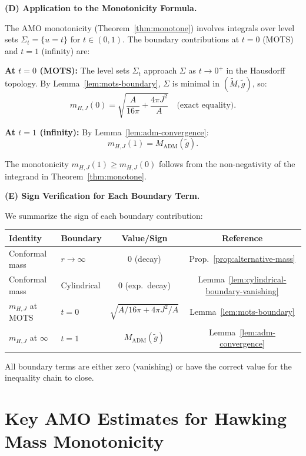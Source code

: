 \documentclass[12pt]{article}
\theoremstyle{plain}
\theoremstyle{definition}
\theoremstyle{remark}
\newcommand{\ADM}{\mathrm{ADM}}
\newcommand{\tM}{\tilde{M}}
\newcommand{\tg}{\tilde{g}}
\begin{document}
\textbf{(D) Application to the Monotonicity Formula.}

The AMO monotonicity (Theorem~\ref{thm:monotone}) involves integrals over level sets $\Sigma_t = \{u = t\}$ for $t \in (0,1)$. The boundary contributions at $t = 0$ (MOTS) and $t = 1$ (infinity) are:

\textbf{At $t = 0$ (MOTS):} The level sets $\Sigma_t$ approach $\Sigma$ as $t \to 0^+$ in the Hausdorff topology. By Lemma~\ref{lem:mots-boundary}, $\Sigma$ is minimal in $(\tM, \tg)$, so:
\[
m_{H,J}(0) = \sqrt{\frac{A}{16\pi} + \frac{4\pi J^2}{A}} \quad \text{(exact equality)}.
\]

\textbf{At $t = 1$ (infinity):} By Lemma~\ref{lem:adm-convergence}:
\[
m_{H,J}(1) = M_{\ADM}(\tg).
\]

The monotonicity $m_{H,J}(1) \geq m_{H,J}(0)$ follows from the non-negativity of the integrand in Theorem~\ref{thm:monotone}.

\textbf{(E) Sign Verification for Each Boundary Term.}

We summarize the sign of each boundary contribution:

\begin{center}
\begin{tabular}{@{}llcc@{}}
\toprule
\textbf{Identity} & \textbf{Boundary} & \textbf{Value/Sign} & \textbf{Reference} \\
\midrule
Conformal mass & $r \to \infty$ & $0$ (decay) & Prop.~\ref{prop:alternative-mass} \\
Conformal mass & Cylindrical & $0$ (exp.\ decay) & Lemma~\ref{lem:cylindrical-boundary-vanishing} \\
$m_{H,J}$ at MOTS & $t = 0$ & $\sqrt{A/16\pi + 4\pi J^2/A}$ & Lemma~\ref{lem:mots-boundary} \\
$m_{H,J}$ at $\infty$ & $t = 1$ & $M_{\ADM}(\tg)$ & Lemma~\ref{lem:adm-convergence} \\
\bottomrule
\end{tabular}
\end{center}

All boundary terms are either zero (vanishing) or have the correct value for the inequality chain to close.


\section{Key AMO Estimates for Hawking Mass Monotonicity}\label{app:amo-estimates}
\end{document}
